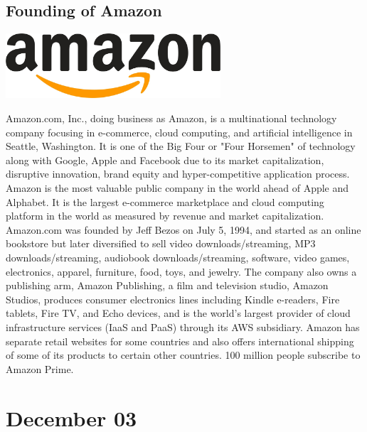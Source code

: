 \documentclass[11pt]{report}
\begin{document}
\subsection{Founding of Amazon}
\vspace{2mm}\begin{center}\includegraphics[width=8cm]{./img/amazonLogo.jpg}\end{center}
Amazon.com, Inc., doing business as Amazon, is a multinational technology company focusing in e-commerce, cloud computing, and artificial intelligence in Seattle, Washington. It is one of the Big Four or "Four Horsemen" of technology along with Google, Apple and Facebook due to its market capitalization, disruptive innovation, brand equity and hyper-competitive application process.\\
\indent Amazon is the most valuable public company in the world ahead of Apple and Alphabet. It is the largest e-commerce marketplace and cloud computing platform in the world as measured by revenue and market capitalization. Amazon.com was founded by Jeff Bezos on July 5, 1994, and started as an online bookstore but later diversified to sell video downloads/streaming, MP3 downloads/streaming, audiobook downloads/streaming, software, video games, electronics, apparel, furniture, food, toys, and jewelry. The company also owns a publishing arm, Amazon Publishing, a film and television studio, Amazon Studios, produces consumer electronics lines including Kindle e-readers, Fire tablets, Fire TV, and Echo devices, and is the world's largest provider of cloud infrastructure services (IaaS and PaaS) through its AWS subsidiary. Amazon has separate retail websites for some countries and also offers international shipping of some of its products to certain other countries. 100 million people subscribe to Amazon Prime.
\section{December 03}
\end{document}
